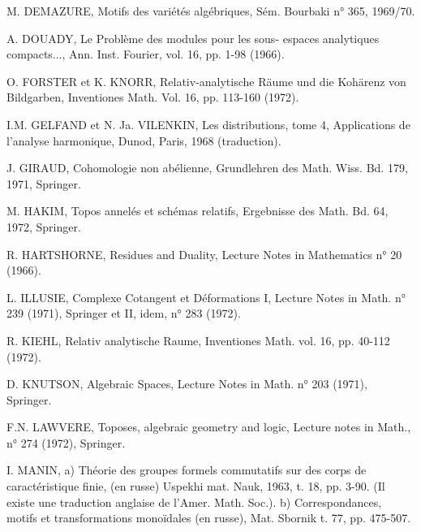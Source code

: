 
M. DEMAZURE, Motifs des variétés algébriques,
Sém. Bourbaki n° 365, 1969/70.

A. DOUADY, Le Problème des modules pour les sous-%
espaces analytiques compacts..., Ann.
Inst. Fourier, vol. 16, pp. 1-98 (1966).

O. FORSTER et K. KNORR, Relativ-analytische Räume
und die Kohärenz von Bildgarben, Inventiones
Math. Vol. 16, pp. 113-160 (1972).

I.M. GELFAND et N. Ja. VILENKIN, Les distributions,
tome 4, Applications de l'analyse harmonique,
Dunod, Paris, 1968 (traduction).

J. GIRAUD, Cohomologie non abélienne, Grundlehren
des Math. Wiss. Bd. 179, 1971, Springer.

M. HAKIM, Topos annelés et schémas relatifs, Ergebnisse
des Math. Bd. 64, 1972, Springer.

R. HARTSHORNE, Residues and Duality, Lecture Notes
in Mathematics n° 20 (1966).

L. ILLUSIE, Complexe Cotangent et Déformations I,
Lecture Notes in Math. n° 239 (1971),
Springer et II, idem, n° 283 (1972).

R. KIEHL, Relativ analytische Raume, Inventiones
Math. vol. 16, pp. 40-112 (1972).

D. KNUTSON, Algebraic Spaces, Lecture Notes in Math.
n° 203 (1971), Springer.

F.N. LAWVERE, Toposes, algebraic geometry and logic,
Lecture notes in Math., n° 274 (1972), Springer.

I. MANIN, a) Théorie des groupes formels commutatifs
sur des corps de caractéristique finie,
(en russe) Uspekhi mat. Nauk, 1963, t. 18,
pp. 3-90. (Il existe une traduction anglaise
de l'Amer. Math. Soc.).
b) Correspondances, motifs et transformations
monoïdales (en russe), Mat. Sbornik t. 77,
pp. 475-507.

